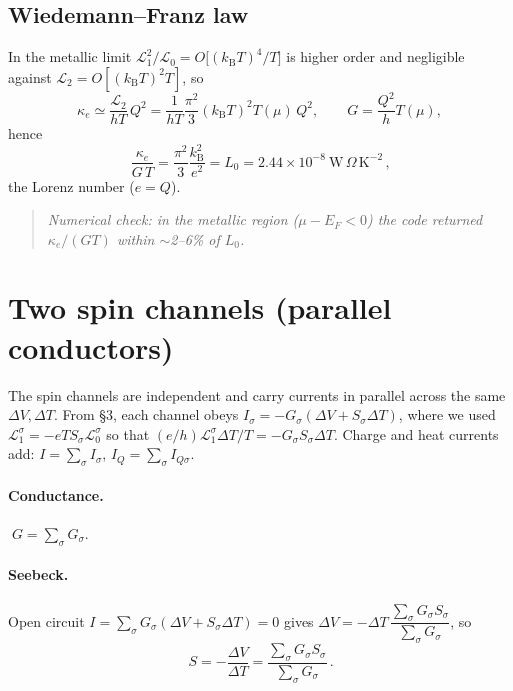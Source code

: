 \documentclass[11pt]{article}
\newcommand{\kB}{k_{\mathrm B}}
\newcommand{\Lloc}{\mathcal{L}}
\begin{document}
\subsection{Wiedemann--Franz law}
In the metallic limit $\Lloc_1^2/\Lloc_0=O\big[(\kB T)^4/T\big]$ is higher order and negligible
against $\Lloc_2=O[(\kB T)^2 T]$, so
\begin{equation}
\kappa_e\simeq\frac{\Lloc_2}{hT}\,Q^2=\frac{1}{hT}\frac{\pi^2}{3}(\kB T)^2 T(\mu)\,Q^2,\qquad
G=\frac{Q^2}{h}T(\mu),
\end{equation}
hence
\begin{equation}
\boxed{\,\frac{\kappa_e}{G\,T}=\frac{\pi^2}{3}\frac{\kB^2}{e^2}=L_0=2.44\times10^{-8}~\text{W}\,\Omega\,\text{K}^{-2}\,,}
\end{equation}
the Lorenz number ($e=Q$).
\begin{quote}\small\itshape
Numerical check: in the metallic region ($\mu-E_F<0$) the code returned $\kappa_e/(GT)$ within
$\sim$2--6\% of $L_0$.
\end{quote}

\section{Two spin channels (parallel conductors)}

The spin channels are independent and carry currents in parallel across the same $\Delta V,\Delta
T$. From \S3, each channel obeys $I_\sigma=-G_\sigma(\Delta V+S_\sigma\Delta T)$, where we used
$\Lloc_1^\sigma=-eT S_\sigma\Lloc_0^\sigma$ so that
$(e/h)\Lloc_1^\sigma\Delta T/T=-G_\sigma S_\sigma\Delta T$. Charge and heat currents add:
$I=\sum_\sigma I_\sigma$, $I_Q=\sum_\sigma I_{Q\sigma}$.

\paragraph{Conductance.} $\;G=\sum_\sigma G_\sigma$.

\paragraph{Seebeck.} Open circuit $I=\sum_\sigma G_\sigma(\Delta V+S_\sigma\Delta T)=0$ gives
$\Delta V=-\Delta T\,\dfrac{\sum_\sigma G_\sigma S_\sigma}{\sum_\sigma G_\sigma}$, so
\begin{equation}
\boxed{\,S=-\frac{\Delta V}{\Delta T}=\frac{\sum_\sigma G_\sigma S_\sigma}{\sum_\sigma G_\sigma}\,.}
\end{equation}
\end{document}
